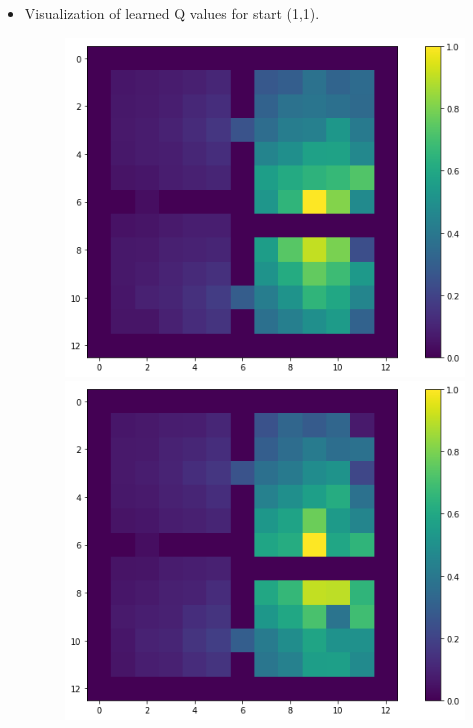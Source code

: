 \documentclass[a4paper]{article}
\begin{document}
\begin{itemize}
\item Visualization of learned Q values for start (1,1).
\begin{figure}[htbp!]
\centering
\begin{minipage}{.5\textwidth}
  \centering
  \includegraphics[width=1\linewidth]{1179.png}
\end{minipage}%
\begin{minipage}{.5\textwidth}
  \centering
  \includegraphics[width=1\linewidth]{1199.png}
\end{minipage}
\end{figure}



\end{itemize}
\end{document}
